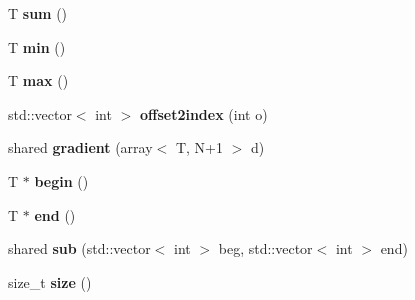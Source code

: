 \begin{DoxyCompactItemize}
\item 
\hypertarget{class____array_acd4f2a6476211e9d948a0d8ae884a3cc}{T {\bfseries sum} ()}\label{class____array_acd4f2a6476211e9d948a0d8ae884a3cc}

\item 
\hypertarget{class____array_a2edfd07e97b1fdca31ad463f2ef9962f}{T {\bfseries min} ()}\label{class____array_a2edfd07e97b1fdca31ad463f2ef9962f}

\item 
\hypertarget{class____array_a9489124f312f9409853b9bf29b6dd585}{T {\bfseries max} ()}\label{class____array_a9489124f312f9409853b9bf29b6dd585}

\item 
\hypertarget{class____array_ab5755f3be1a48c4c62a12adc512dac16}{std\-::vector$<$ int $>$ {\bfseries offset2index} (int o)}\label{class____array_ab5755f3be1a48c4c62a12adc512dac16}

\item 
\hypertarget{class____array_aa34252173164544a96d1f2e0fa2875e3}{shared {\bfseries gradient} (array$<$ T, N+1 $>$ d)}\label{class____array_aa34252173164544a96d1f2e0fa2875e3}

\item 
\hypertarget{class____array_a9e073ed33e0fad10acbbb001af3c10b1}{T $\ast$ {\bfseries begin} ()}\label{class____array_a9e073ed33e0fad10acbbb001af3c10b1}

\item 
\hypertarget{class____array_a0e7f0ce953b4d180a940c14e34b503db}{T $\ast$ {\bfseries end} ()}\label{class____array_a0e7f0ce953b4d180a940c14e34b503db}

\item 
\hypertarget{class____array_a0a736891406c46548f11a8707508d7c1}{shared {\bfseries sub} (std\-::vector$<$ int $>$ beg, std\-::vector$<$ int $>$ end)}\label{class____array_a0a736891406c46548f11a8707508d7c1}

\item 
\hypertarget{class____array_abbc3e2f4041747fdb3de9b224db7cb1e}{size\-\_\-t {\bfseries size} ()}\label{class____array_abbc3e2f4041747fdb3de9b224db7cb1e}

\end{DoxyCompactItemize}
